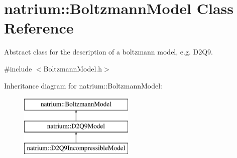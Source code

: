 \hypertarget{classnatrium_1_1BoltzmannModel}{\section{natrium\-:\-:Boltzmann\-Model Class Reference}
\label{classnatrium_1_1BoltzmannModel}
}


Abstract class for the description of a boltzmann model, e.\-g. D2\-Q9.  




{\ttfamily \#include $<$Boltzmann\-Model.\-h$>$}

Inheritance diagram for natrium\-:\-:Boltzmann\-Model\-:\begin{figure}[H]
\begin{center}
\leavevmode
\includegraphics[height=3.000000cm]{classnatrium_1_1BoltzmannModel}
\end{center}
\end{figure}
